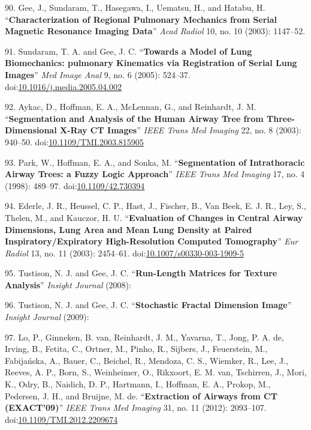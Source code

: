 \documentclass[11pt,]{article}
\begin{document}
90. Gee, J., Sundaram, T., Hasegawa, I., Uematsu, H., and Hatabu, H.
``\textbf{Characterization of Regional Pulmonary Mechanics from Serial
Magnetic Resonance Imaging Data}'' \emph{Acad Radiol} 10, no. 10 (2003):
1147--52.

91. Sundaram, T. A. and Gee, J. C. ``\textbf{Towards a Model of Lung
Biomechanics: pulmonary Kinematics via Registration of Serial Lung
Images}'' \emph{Med Image Anal} 9, no. 6 (2005): 524--37.
doi:\href{http://dx.doi.org/10.1016/j.media.2005.04.002}{10.1016/j.media.2005.04.002}

92. Aykac, D., Hoffman, E. A., McLennan, G., and Reinhardt, J. M.
``\textbf{Segmentation and Analysis of the Human Airway Tree from
Three-Dimensional X-Ray CT Images}'' \emph{IEEE Trans Med Imaging} 22,
no. 8 (2003): 940--50.
doi:\href{http://dx.doi.org/10.1109/TMI.2003.815905}{10.1109/TMI.2003.815905}

93. Park, W., Hoffman, E. A., and Sonka, M. ``\textbf{Segmentation of
Intrathoracic Airway Trees: a Fuzzy Logic Approach}'' \emph{IEEE Trans
Med Imaging} 17, no. 4 (1998): 489--97.
doi:\href{http://dx.doi.org/10.1109/42.730394}{10.1109/42.730394}

94. Ederle, J. R., Heussel, C. P., Hast, J., Fischer, B., Van Beek, E.
J. R., Ley, S., Thelen, M., and Kauczor, H. U. ``\textbf{Evaluation of
Changes in Central Airway Dimensions, Lung Area and Mean Lung Density at
Paired Inspiratory/Expiratory High-Resolution Computed Tomography}''
\emph{Eur Radiol} 13, no. 11 (2003): 2454--61.
doi:\href{http://dx.doi.org/10.1007/s00330-003-1909-5}{10.1007/s00330-003-1909-5}

95. Tustison, N. J. and Gee, J. C. ``\textbf{Run-Length Matrices for
Texture Analysis}'' \emph{Insight Journal} (2008):

96. Tustison, N. J. and Gee, J. C. ``\textbf{Stochastic Fractal
Dimension Image}'' \emph{Insight Journal} (2009):

97. Lo, P., Ginneken, B. van, Reinhardt, J. M., Yavarna, T., Jong, P. A.
de, Irving, B., Fetita, C., Ortner, M., Pinho, R., Sijbers, J.,
Feuerstein, M., Fabija{ń}ska, A., Bauer, C., Beichel, R., Mendoza, C.
S., Wiemker, R., Lee, J., Reeves, A. P., Born, S., Weinheimer, O.,
Rikxoort, E. M. van, Tschirren, J., Mori, K., Odry, B., Naidich, D. P.,
Hartmann, I., Hoffman, E. A., Prokop, M., Pedersen, J. H., and Bruijne,
M. de. ``\textbf{Extraction of Airways from CT (EXACT'09)}'' \emph{IEEE
Trans Med Imaging} 31, no. 11 (2012): 2093--107.
doi:\href{http://dx.doi.org/10.1109/TMI.2012.2209674}{10.1109/TMI.2012.2209674}
\end{document}
